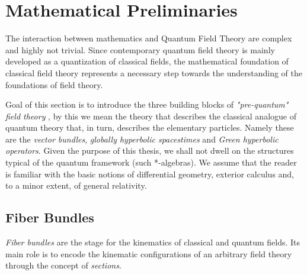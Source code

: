 \documentclass[Main]{subfiles}
\begin{document}
\chapter{Mathematical Preliminaries}
	The interaction between mathematics and Quantum Field Theory are complex and highly not trivial.
	Since contemporary quantum field theory is mainly developed as a quantization of classical fields, the mathematical foundation of classical field theory represents a necessary step towards the understanding of the foundations of field theory.

	Goal of this section is to introduce the three  building blocks of \emph{"pre-quantum" field theory} , by this we mean the theory that describes the classical analogue of quantum theory that, in turn, describes the elementary particles.
	Namely these are the \emph{vector bundles}, \emph{globally hyperbolic spacestimes} and \emph{Green hyperbolic operators}.
	Given the purpose of this thesis, we shall not dwell on the structures typical of the quantum framework (such *-algebras).
	We assume that the reader is familiar with the basic notions of differential geometry, exterior calculus and, to a minor extent, of general relativity.
	\section{Fiber Bundles}
		\emph{Fiber bundles} are the stage for the kinematics of classical and quantum fields.
		Its main role is to encode the kinematic configurations of an arbitrary field theory through the concept of
		\emph{sections}.
\end{document}
